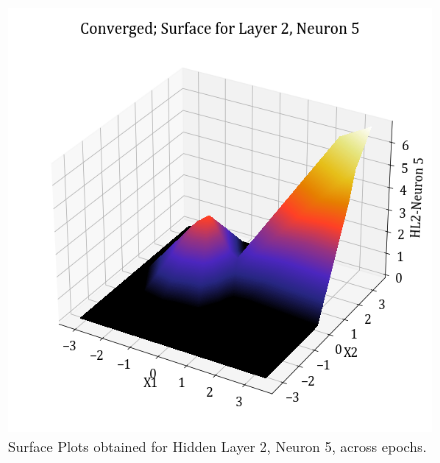 \documentclass[11pt,a4paper]{article}
\begin{document}
\begin{figure}[H]
    \includegraphics[scale=0.4]{images/1B_MLFFNN_conv_HL2_N5.png}
    \caption{Surface Plots obtained for Hidden Layer 2, Neuron 5, across epochs.}
\end{figure}
\end{document}
